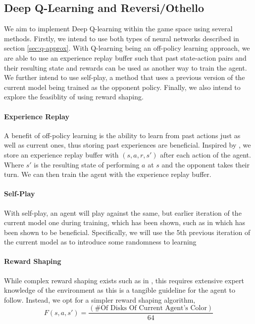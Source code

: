 \documentclass[../report.tex]{subfiles}
\begin{document}
\subsection{Deep Q-Learning and Reversi/Othello}
We aim to implement Deep Q-learning within the game space using several methods. Firstly, we intend to use both types of neural networks described in section \ref{sec:q-approx}. With Q-learning being an off-policy learning approach, we are able to use an experience replay buffer such that past state-action pairs and their resulting state and rewards can be used as another way to train the agent. We further intend to use self-play, a method that uses a previous version of the current model being trained as the opponent policy. Finally, we also intend to explore the feasiblity of using reward shaping.

\paragraph{Experience Replay}
A benefit of off-policy learning is the ability to learn from past actions just as well as current ones, thus storing past experiences are beneficial. Inspired by \citet{mnih2013playing}, we store an experience replay buffer with $(s,a,r,s')$ after each action of the agent. Where $s'$ is the resulting state of performing $a$ at $s$ and the opponent takes their turn. We can then train the agent with the experience replay buffer.

\paragraph{Self-Play}
With self-play, an agent will play against the same, but earlier iteration of the current model one during training, which has been shown, such as in \citet{ree13} which has been shown to be beneficial. Specifically, we will use the 5th previous iteration of the current model as to introduce some randomness to learning

\paragraph{Reward Shaping}
While complex reward shaping exists such as in \cite{ng1999policy}, this requires extensive expert knowledge of the environment as this is a tangible guideline for the agent to follow. Instead, we opt for a simpler reward shaping algorithm,
\begin{equation}\label{eq:simple-reward-shaping}
    F(s,a,s') = \frac{(\text{\# Of Disks Of Current Agent's Color})}{64}
\end{equation}
\end{document}

